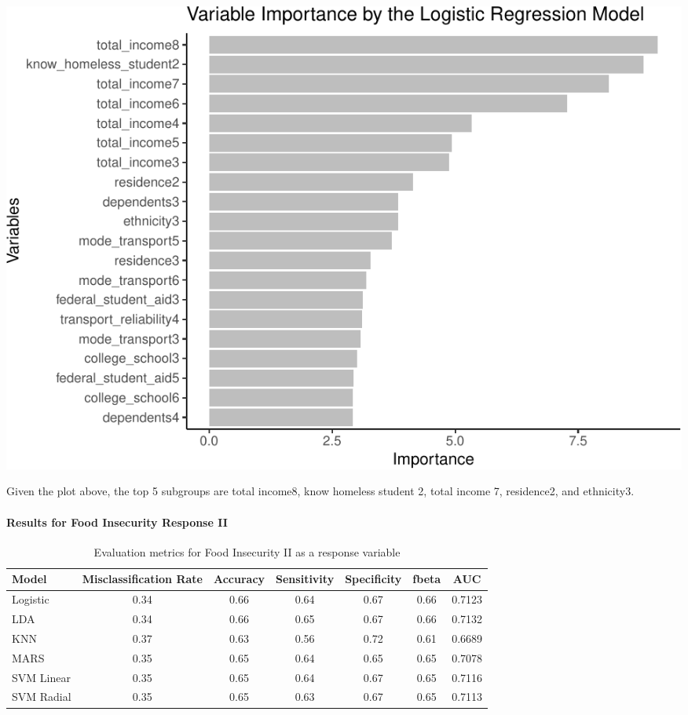 \documentclass[
  10pt,
]{article}
\begin{document}
\begin{center}\includegraphics{phase2_report_files/figure-latex/unnamed-chunk-20-1} \end{center}

Given the plot above, the top 5 subgroups are total income8, know homeless student 2, total income 7, residence2, and ethnicity3.\\

\hypertarget{results-for-food-insecurity-response-ii}{%
\paragraph{Results for Food Insecurity Response II}\label{results-for-food-insecurity-response-ii}}

\begin{table}[H]

\caption{\label{tab:unnamed-chunk-21}Evaluation metrics for Food Insecurity II  as a response variable}
\centering
\fontsize{12}{14}\selectfont
\begin{tabular}[t]{lcccccc}
\toprule
Model & Misclassification Rate & Accuracy & Sensitivity & Specificity & fbeta & AUC\\
\midrule
Logistic & 0.34 & 0.66 & 0.64 & 0.67 & 0.66 & 0.7123\\
LDA & 0.34 & 0.66 & 0.65 & 0.67 & 0.66 & 0.7132\\
KNN & 0.37 & 0.63 & 0.56 & 0.72 & 0.61 & 0.6689\\
MARS & 0.35 & 0.65 & 0.64 & 0.65 & 0.65 & 0.7078\\
SVM Linear & 0.35 & 0.65 & 0.64 & 0.67 & 0.65 & 0.7116\\
SVM Radial & 0.35 & 0.65 & 0.63 & 0.67 & 0.65 & 0.7113\\
\bottomrule
\end{tabular}
\end{table}
\end{document}
